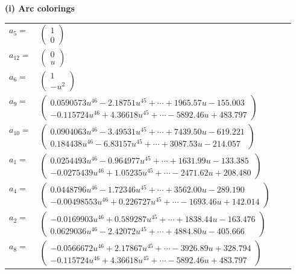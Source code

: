 \documentclass[1p]{elsarticle_modified}
\theoremstyle{definition}
\begin{document}
\flushleft \textbf{(i) Arc colorings}\\
\begin{tabular}{m{7pt} m{180pt} m{7pt} m{180pt} }
\flushright $a_{5}=$&$\begin{pmatrix}1\\0\end{pmatrix}$ \\
\flushright $a_{12}=$&$\begin{pmatrix}0\\u\end{pmatrix}$ \\
\flushright $a_{6}=$&$\begin{pmatrix}1\\- u^2\end{pmatrix}$ \\
\flushright $a_{9}=$&$\begin{pmatrix}0.0590573 u^{46}-2.18751 u^{45}+\cdots+1965.57 u-155.003\\-0.115724 u^{46}+4.36618 u^{45}+\cdots-5892.46 u+483.797\end{pmatrix}$ \\
\flushright $a_{10}=$&$\begin{pmatrix}0.0904063 u^{46}-3.49531 u^{45}+\cdots+7439.50 u-619.221\\0.184438 u^{46}-6.83157 u^{45}+\cdots+3087.53 u-214.057\end{pmatrix}$ \\
\flushright $a_{1}=$&$\begin{pmatrix}0.0254493 u^{46}-0.964977 u^{45}+\cdots+1631.99 u-133.385\\-0.0275439 u^{46}+1.05235 u^{45}+\cdots-2471.62 u+208.480\end{pmatrix}$ \\
\flushright $a_{4}=$&$\begin{pmatrix}0.0448796 u^{46}-1.72346 u^{45}+\cdots+3562.00 u-289.190\\-0.00498553 u^{46}+0.226727 u^{45}+\cdots-1693.46 u+142.014\end{pmatrix}$ \\
\flushright $a_{2}=$&$\begin{pmatrix}-0.0169903 u^{46}+0.589287 u^{45}+\cdots+1838.44 u-163.476\\0.0629036 u^{46}-2.42072 u^{45}+\cdots+4884.80 u-405.666\end{pmatrix}$ \\
\flushright $a_{8}=$&$\begin{pmatrix}-0.0566672 u^{46}+2.17867 u^{45}+\cdots-3926.89 u+328.794\\-0.115724 u^{46}+4.36618 u^{45}+\cdots-5892.46 u+483.797\end{pmatrix}$ \\

\end{tabular}
\end{document}
